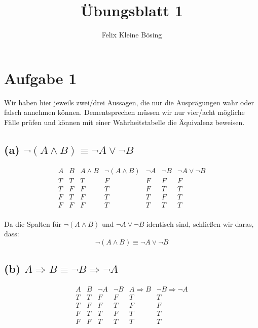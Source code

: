 \documentclass[11pt]{article}
\begin{document}
\title{Übungsblatt 1}
\author{Felix Kleine Bösing}
\maketitle

\section*{Aufgabe 1}

Wir haben hier jeweils zwei/drei Aussagen, die nur die Ausprägungen wahr oder falsch annehmen können.
Dementsprechen müssen wir nur vier/acht mögliche Fälle prüfen und können mit einer Wahrheitstabelle die Äquivalenz beweisen.

\subsection*{(a) \( \neg (A \land B) \equiv \neg A \lor \neg B \)}


\[
\begin{array}{|c|c|c|c|c|c|c|}
A & B & A \land B & \neg (A \land B) & \neg A & \neg B & \neg A \lor \neg B \\
\hline
T & T & T & F & F & F & F \\
T & F & F & T & F & T & T \\
F & T & F & T & T & F & T \\
F & F & F & T & T & T & T \\
\end{array}
\]

Da die Spalten für \( \neg (A \land B) \) und \( \neg A \lor \neg B \) identisch sind, schließen wir daras, dass:
\[
\neg (A \land B) \equiv \neg A \lor \neg B
\]

\subsection*{(b) \( A \Rightarrow B \equiv \neg B \Rightarrow \neg A \)}


\[
\begin{array}{|c|c|c|c|c|c|}
A & B & \neg A & \neg B & A \Rightarrow B & \neg B \Rightarrow \neg A \\
\hline
T & T & F & F & T & T \\
T & F & F & T & F & F \\
F & T & T & F & T & T \\
F & F & T & T & T & T \\
\end{array}
\]
\end{document}
